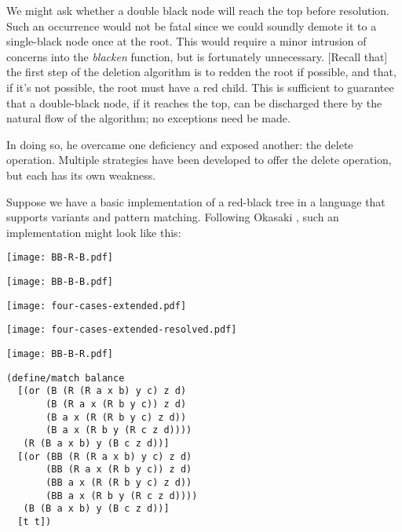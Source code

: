 \documentclass[preprint]{sigplanconf}
\begin{document}
We might ask whether a double black node will reach the top before resolution. Such an occurrence would not be fatal since we could soundly demote it to a single-black node once at the root. This would require a minor intrusion of concerns into the \emph{blacken} function, but is fortunately unnecessary. [Recall that] the first step of the deletion algorithm is to redden the root if possible, and that, if it's not possible, the root must have a red child. This is sufficient to guarantee that a double-black node, if it reaches the top, can be discharged there by the natural flow of the algorithm; no exceptions need be made.

In doing so, he overcame one deficiency and exposed another: the delete operation. Multiple strategies have been developed to offer the delete operation, but each has its own weakness.

Suppose we have a basic implementation of a red-black tree in a language that supports variants and pattern matching. Following Okasaki \cite{okasaki1999functional}, such an implementation might look like this:

\begin{center}
\texttt{[image: BB-R-B.pdf]}
\end{center}
\begin{center}
\texttt{[image: BB-B-B.pdf]}
\end{center}
\begin{center}
\texttt{[image: four-cases-extended.pdf]}
\end{center}
\begin{center}
\texttt{[image: four-cases-extended-resolved.pdf]}
\end{center}
\begin{center}
\texttt{[image: BB-B-R.pdf]}
\end{center}
\begin{verbatim}
(define/match balance
  [(or (B (R (R a x b) y c) z d)
       (B (R a x (R b y c)) z d)
       (B a x (R (R b y c) z d))
       (B a x (R b y (R c z d))))
   (R (B a x b) y (B c z d))]
  [(or (BB (R (R a x b) y c) z d)
       (BB (R a x (R b y c)) z d)
       (BB a x (R (R b y c) z d))
       (BB a x (R b y (R c z d))))
   (B (B a x b) y (B c z d))]
  [t t])
\end{verbatim}
\end{document}
